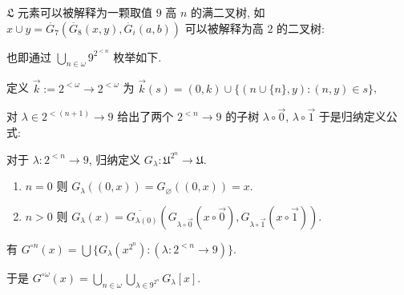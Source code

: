 \begin{remark}
    \(\mathfrak{L}\) 元素可以被解释为一颗取值 \(9\) 高 \(n\) 的满二叉树, 如 \(x \cup y = \ddot{G_7} (\ddot{G_8} (x,y), \ddot{G_i} (a,b))\) 可以被解释为高 \(2\) 的二叉树:

    \begin{center}
    \end{center}

    也即通过 \(\bigcup_{n \in \omega} 9^{2^{< n}}\) 枚举如下.
\end{remark}

定义 \(\vec{k} := 2^{< \omega} \to 2^{< \omega}\) 为 \(\vec{k} (s) = {(0,k)} \cup \{(n \cup \{n\}, y) : (n,y) \in s\}\), 

对 \(\lambda \in 2^{< (n+1)} \to 9\) 给出了两个 \(2^{< n} \to 9\) 的子树 \(\lambda \circ \vec{0}\), \(\lambda \circ \vec{1}\) 于是归纳定义公式:

\begin{definition}
    对于 \(\lambda : 2^{< n} \to 9\), 归纳定义 \(G_\lambda : \mathfrak{U}^{2^n} \to \mathfrak{U}\).
    \begin{enumerate}
        \item \(n = 0\) 则 \(G_\lambda ((0,x)) = G_\varnothing ((0,x)) = x\).
        \item \(n > 0\) 则 \(G_\lambda (x) = \ddot{G_{\lambda(0)}} (G_{\lambda \circ \vec{0}} (x \circ \vec{0}), G_{\lambda \circ \vec{1}} (x \circ \vec{1}))\).
    \end{enumerate}
\end{definition}

\begin{corollary}
    有 \(G^{\circ n} (x) = \bigcup \{G_\lambda (x^{2^n}) : (\lambda : 2^{< n} \to 9)\}\).
    
    于是 \(G^{\circ \omega} (x) = \bigcup_{n \in \omega} \bigcup_{\lambda \in 9^{2^n}} G_\lambda[x]\).
\end{corollary}

